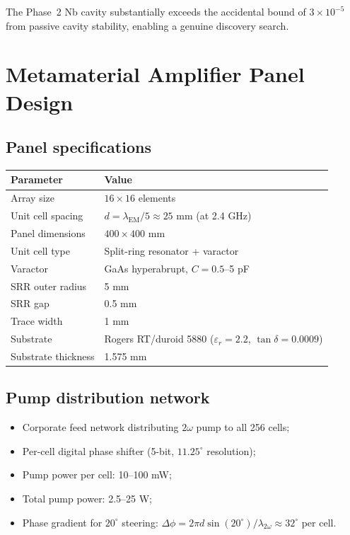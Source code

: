 \documentclass[12pt,letterpaper]{article}
\begin{document}
The Phase~2 Nb cavity substantially exceeds the accidental bound of
$3\times 10^{-5}$ from passive cavity stability, enabling a genuine
discovery search.

\section{Metamaterial Amplifier Panel Design}

\subsection{Panel specifications}

\begin{tabular}{ll}
\toprule
Parameter & Value \\
\midrule
Array size & $16 \times 16$ elements \\
Unit cell spacing & $d = \lambda_{\text{EM}}/5 \approx 25$ mm (at 2.4 GHz) \\
Panel dimensions & $400 \times 400$ mm \\
Unit cell type & Split-ring resonator + varactor \\
Varactor & GaAs hyperabrupt, $C = 0.5$--5 pF \\
SRR outer radius & 5 mm \\
SRR gap & 0.5 mm \\
Trace width & 1 mm \\
Substrate & Rogers RT/duroid 5880 ($\varepsilon_r = 2.2$, $\tan\delta = 0.0009$) \\
Substrate thickness & 1.575 mm \\
\bottomrule
\end{tabular}

\subsection{Pump distribution network}

\begin{itemize}[noitemsep]
  \item Corporate feed network distributing $2\omega$ pump to all 256 cells;
  \item Per-cell digital phase shifter (5-bit, $11.25^\circ$ resolution);
  \item Pump power per cell: 10--100 mW;
  \item Total pump power: 2.5--25 W;
  \item Phase gradient for $20^\circ$ steering:
    $\Delta\phi = 2\pi d\sin(20^\circ)/\lambda_{2\omega} \approx 32^\circ$
    per cell.
\end{itemize}
\end{document}
